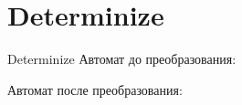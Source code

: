 \section{Determinize}
\begin{frame}{Determinize}
	Автомат до преобразования:


	Автомат после преобразования:


\end{frame}
